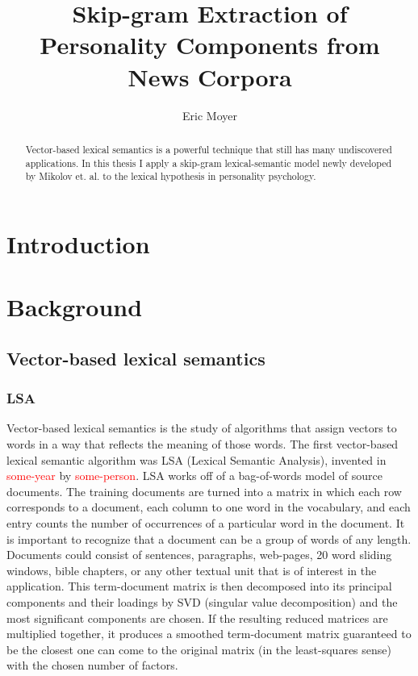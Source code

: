 \documentclass[10pt,letterpaper]{article}
\author{Eric Moyer}
\title{Skip-gram Extraction of Personality Components from News Corpora}
\newcommand{\todo}[1]{\textcolor{red}{#1}}
\begin{document}
\maketitle

\begin{abstract}
Vector-based lexical semantics is a powerful technique that still has many undiscovered applications. In this thesis I apply a skip-gram lexical-semantic model newly developed by Mikolov et. al. to the lexical hypothesis in personality psychology.
\end{abstract}

\section{Introduction}

\section{Background}

\subsection{Vector-based lexical semantics}

\subsubsection{LSA}

Vector-based lexical semantics is the study of algorithms that assign vectors to words in a way that reflects the meaning of those words. The first vector-based lexical semantic algorithm was LSA (Lexical Semantic Analysis), invented in \todo{some-year} by \todo{some-person}. LSA works off of a bag-of-words model of source documents. The training documents are turned into a matrix in which each row corresponds to a document, each column to one word in the vocabulary, and each entry counts the number of occurrences of a particular word in the document. It is important to recognize that a document can be a group of words of any length. Documents could consist of sentences, paragraphs, web-pages, 20 word sliding windows, bible chapters, or any other textual unit that is of interest in the application. This term-document matrix is then decomposed into its principal components and their loadings by SVD (singular value decomposition) and the most significant components are chosen. If the resulting reduced matrices are multiplied together, it produces a smoothed term-document matrix guaranteed to be the closest one can come to the original matrix (in the least-squares sense) with the chosen number of factors.
\end{document}

